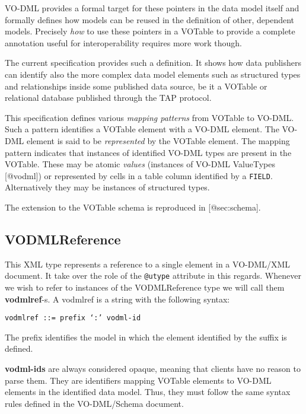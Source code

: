 \documentclass[11pt,a4paper]{ivoa}
\begin{document}
VO-DML provides a formal target for these pointers in the data model
itself and formally defines how models can be reused in the definition
of other, dependent models. Precisely \emph{how} to use these pointers
in a VOTable to provide a complete annotation useful for
interoperability requires more work though.

The current specification provides such a definition. It shows how data
publishers can identify also the more complex data model elements such
as structured types and relationships inside some published data source,
be it a VOTable or relational database published through the TAP
protocol.

This specification defines various \emph{mapping patterns} from VOTable
to VO-DML. Such a pattern identifies a VOTable element with a VO-DML
element. The VO-DML element is said to be \emph{represented} by the
VOTable element. The mapping pattern indicates that instances of
identified VO-DML types are present in the VOTable. These may be atomic
\emph{values} (instances of VO-DML ValueTypes {[}@vodml{]}) or
represented by cells in a table column identified by a \texttt{FIELD}.
Alternatively they may be instances of structured types.

The extension to the VOTable schema is reproduced in {[}@sec:schema{]}.

\subsection{VODMLReference}\label{vodmlreference}

This XML type represents a reference to a single element in a VO-DML/XML
document. It take over the role of the \texttt{@utype} attribute in this
regards. Whenever we wish to refer to instances of the VODMLReference
type we will call them \textbf{vodmlref}-s. A vodmlref is a string with
the following syntax:

\begin{verbatim}
vodmlref ::= prefix ‘:’ vodml-id
\end{verbatim}

The prefix identifies the model in which the element identified by the
suffix is defined.

\textbf{vodml-ids} are always considered opaque, meaning that clients
have no reason to parse them. They are identifiers mapping VOTable
elements to VO-DML elements in the identified data model. Thus, they
must follow the same syntax rules defined in the VO-DML/Schema document.
\end{document}
